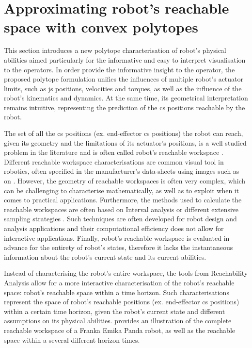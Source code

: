 \section{Approximating robot's reachable space with convex polytopes}
\label{ch:hfr}

This section introduces a new polytope characterisation of robot's physical abilities aimed particularly for the informative and easy to interpret visualisation to the operators. In order provide the informative insight to the operator, the proposed polytope formulation unifies the influences of multiple robot's actuator limits, such as \gls{js} positions, velocities and torques, as well as the influence of the robot's kinematics and dynamics. At the same time, its geometrical interpretation remains intuitive, representing the prediction of the \gls{cs} positions reachable by the robot.

The set of all the \gls{cs} positions (ex. end-effector \gls{cs} positions) the robot can reach, given its geometry and the limitations of its actuator's positions, is a well studied problem in the literature and is often called robot's reachable workspace \cite{Gosselin1991Synthesis,Vahrenkamp2016,kucuk2005robot}. Different reachable workspace characterisations are common visual tool in robotics, often specified in the manufacturer's data-sheets \cite{ur3data,franka_maual} using images such as on .  
However, the geometry of reachable workspaces is often very complex, which can be challenging to characterise mathematically, as well as to exploit when it comes to practical applications. Furthermore, the methods used to calculate the reachable workspaces are often based on Interval analysis \cite{gouttefarde2011interval} or different extensive sampling strategies \cite{Vahrenkamp2016,Zacharias2007}. Such techniques are often developed for robot design and analysis applications and their computational efficiency does not allow for interactive applications. Finally, robot's reachable workspace is evaluated in advance for the entirety of robot's states, therefore it lacks the instantaneous information about the robot's current state and its current abilities.

Instead of characterising the robot's entire workspace, the tools from Reachability Analysis \cite{althoff2010reachability,althoff2014} allow for a more interactive characterisation of the robot's reachable space: robot's reachable space within a time horizon. Such characterisations represent the space of robot's reachable positions (ex. end-effector \gls{cs} positions) within a certain time horizon, given the robot's current state and different assumptions on its physical abilities.  provides an illustration of the complete reachable workspace of a Franka Emika Panda robot, as well as the reachable space within a several different horizon times.

